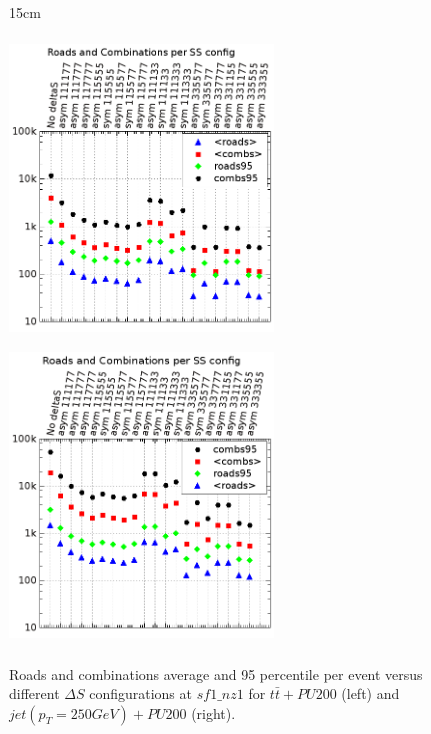 \begin{figure}[htbp]{15cm}
	\caption{Roads and combinations average and 95 percentile per event versus different $\Delta S$ configurations at $sf1\_nz1$ for $t\bar{t}+PU200$ (left) and $jet(p_{T}=250GeV)+PU200$ (right).}
	\centering
	\includegraphics[width=7cm,height=8cm]{AppendixCMSL1TT/figs/final_plots/ttbar_pu200_smu_roads_combs_deltaS}
	\includegraphics[width=7cm,height=8cm]{AppendixCMSL1TT/figs/final_plots/jet_Pt250_pu200_roads_combs_deltaS}
	\label{fig:deltaS_roads_combs}
\end{figure}

